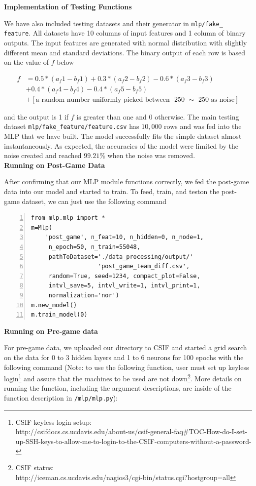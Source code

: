 \documentclass[12pt]{article}
\begin{document}
\textbf{Implementation of Testing Functions} 

\quad We have also included testing datasets and their generator in \texttt{mlp/fake\_\\feature}. All datasets have 10 columns of input features and 1 column of binary outputs. The input features are generated with normal distribution with slightly different mean and standard deviations. The binary output of each row is based on the value of $f$ below

\begin{align}
f &= 0.5*(a_f1-b_f1) + 0.3*(a_f2-b_f2) - 0.6*(a_f3-b_f3) \\
   &+ 0.4*(a_f4-b_f4) - 0.4*(a_f5-b_f5)\\
   &+ [\text{a random number uniformly picked between -250 $\sim$ 250 as noise}]
\end{align}

and the output is 1 if $f$ is greater than one and 0 otherwise. The main testing dataset \texttt{mlp/fake\_feature/feature.csv} has $10,000$ rows and was fed into the MLP that we have built. The model successfully fits the simple dataset almost instantaneously. As expected, the accuracies of the model were limited by the noise created and reached $99.21\%$ when the noise was removed. \\


\textbf{Running on Post-Game Data}

\quad After confirming that our MLP module functions correctly, we fed the post-game data into our model and started to train. To feed, train, and teston the post-game dataset, we can just use the following command

\lstset{language=Python, upquote=true}
\begin{lstlisting}[basicstyle=\small, numbers=left]
from mlp.mlp import *
m=Mlp(
    'post_game', n_feat=10, n_hidden=0, n_node=1, 
     n_epoch=50, n_train=55048,
     pathToDataset='./data_processing/output/'
                   'post_game_team_diff.csv',
     random=True, seed=1234, compact_plot=False,
     intvl_save=5, intvl_write=1, intvl_print=1,
     normalization='nor')
m.new_model()
m.train_model(0)
\end{lstlisting}

\textbf{Running on Pre-game data}

\quad For pre-game data, we uploaded our directory to CSIF and started a grid search on the data for 0 to 3 hidden layers and 1 to 6 neurons for 100 epochs with the following command (Note: to use the following function, user must set up keyless login\footnote{CSIF keyless login setup: \\ http://csifdocs.cs.ucdavis.edu/about-us/csif-general-faq\#TOC-How-do-I-set-up-SSH-keys-to-allow-me-to-login-to-the-CSIF-computers-without-a-password-} and assure that the machines to be used are not down\footnote{CSIF status: \\ http://iceman.cs.ucdavis.edu/nagios3/cgi-bin/status.cgi?hostgroup=all}. More details on running the function, including the argument descriptions, are inside of the function description in \texttt{/mlp/mlp.py}): 
\end{document}
